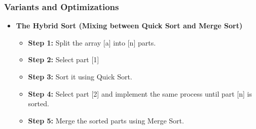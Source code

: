     \subsubsection{Variants and Optimizations}
        \begin{itemize}
            \item \textbf{The Hybrid Sort (Mixing between Quick Sort and Merge Sort)}
            \begin{itemize}
                \item \textbf{Step 1:} Split the array [a] into [n] parts.
                \item \textbf{Step 2:} Select part [1]
                \item \textbf{Step 3:} Sort it using Quick Sort.
                \item \textbf{Step 4:} Select part [2] and implement the same process until part [n] is sorted.
                \item \textbf{Step 5:} Merge the sorted parts using Merge Sort.
            \end{itemize}
        \end{itemize}
